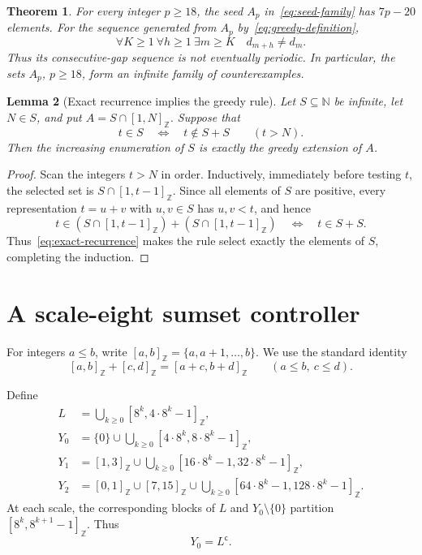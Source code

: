 \documentclass[11pt,letterpaper]{article}
\newtheorem{theorem}{Theorem}[section]
\newtheorem{lemma}[theorem]{Lemma}
\newcommand{\N}{\mathbb{N}}
\newcommand{\cpl}[1]{#1^{\mathsf{c}}}
\newcommand{\ints}[2]{[#1,#2]_{\mathbb{Z}}}
\begin{document}
\begin{theorem}\label{thm:main}
For every integer \(p\geq18\), the seed \(A_p\) in~\eqref{eq:seed-family} has \(7p-20\) elements. For the sequence generated from \(A_p\) by~\eqref{eq:greedy-definition},
\[
\forall K\geq1\ \forall h\geq1\ \exists m\geq K
\quad d_{m+h}\neq d_m.
\]
Thus its consecutive-gap sequence is not eventually periodic. In particular, the sets \(A_p\), \(p\geq18\), form an infinite family of counterexamples.
\end{theorem}

\begin{lemma}[Exact recurrence implies the greedy rule]\label{lem:greedy}
Let \(S\subseteq\N\) be infinite, let \(N\in S\), and put \(A=S\cap\ints{1}{N}\). Suppose that
\begin{equation}\label{eq:exact-recurrence}
t\in S
\quad\Longleftrightarrow\quad
t\notin S+S
\qquad (t>N).
\end{equation}
Then the increasing enumeration of \(S\) is exactly the greedy extension of \(A\).
\end{lemma}

\begin{proof}
Scan the integers \(t>N\) in order. Inductively, immediately before testing \(t\), the selected set is \(S\cap\ints{1}{t-1}\). Since all elements of \(S\) are positive, every representation \(t=u+v\) with \(u,v\in S\) has \(u,v<t\), and hence
\[
t\in(S\cap\ints{1}{t-1})+(S\cap\ints{1}{t-1})
\quad\Longleftrightarrow\quad t\in S+S.
\]
Thus~\eqref{eq:exact-recurrence} makes the rule select exactly the elements of \(S\), completing the induction.
\end{proof}

\section{A scale-eight sumset controller}

For integers \(a\leq b\), write \(\ints{a}{b}=\{a,a+1,\ldots,b\}\). We use the standard identity
\begin{equation}\label{eq:interval-sum}
\ints{a}{b}+\ints{c}{d}=\ints{a+c}{b+d}
\qquad (a\leq b,\ c\leq d).
\end{equation}

Define
\begin{align}
L&=\bigcup_{k\geq0}\ints{8^k}{4\cdot8^k-1}, \\
Y_0&=\{0\}\cup
      \bigcup_{k\geq0}\ints{4\cdot8^k}{8\cdot8^k-1},
      \label{eq:Y0}\\
Y_1&=\ints{1}{3}\cup
      \bigcup_{k\geq0}\ints{16\cdot8^k-1}{32\cdot8^k-1},
      \label{eq:Y1}\\
Y_2&=\ints{0}{1}\cup\ints{7}{15}\cup
      \bigcup_{k\geq0}\ints{64\cdot8^k-1}{128\cdot8^k-1}.
      \label{eq:Y2}
\end{align}
At each scale, the corresponding blocks of \(L\) and \(Y_0\setminus\{0\}\) partition \(\ints{8^k}{8^{k+1}-1}\). Thus
\begin{equation}\label{eq:Y0-complement-L}
Y_0=\cpl{L}.
\end{equation}
\end{document}
